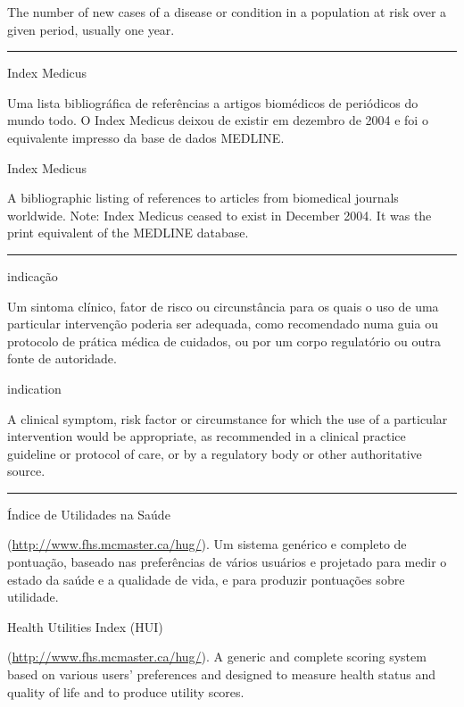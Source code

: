 \documentclass[
]{book}
\begin{document}
The number of new cases of a disease or condition in a population at risk over a given period, usually one year.

\begin{center}\rule{0.5\linewidth}{0.5pt}\end{center}

Index Medicus

Uma lista bibliográfica de referências a artigos biomédicos de periódicos do mundo todo. O Index Medicus deixou de existir em dezembro de 2004 e foi o equivalente impresso da base de dados MEDLINE.

Index Medicus

A bibliographic listing of references to articles from biomedical journals worldwide. Note: Index Medicus ceased to exist in December 2004. It was the print equivalent of the MEDLINE database.

\begin{center}\rule{0.5\linewidth}{0.5pt}\end{center}

indicação

Um sintoma clínico, fator de risco ou circunstância para os quais o uso de uma particular intervenção poderia ser adequada, como recomendado numa guia ou protocolo de prática médica de cuidados, ou por um corpo regulatório ou outra fonte de autoridade.

indication

A clinical symptom, risk factor or circumstance for which the use of a particular intervention would be appropriate, as recommended in a clinical practice guideline or protocol of care, or by a regulatory body or other authoritative source.

\begin{center}\rule{0.5\linewidth}{0.5pt}\end{center}

Índice de Utilidades na Saúde

(\url{http://www.fhs.mcmaster.ca/hug/}). Um sistema genérico e completo de pontuação, baseado nas preferências de vários usuários e projetado para medir o estado da saúde e a qualidade de vida, e para produzir pontuações sobre utilidade.

Health Utilities Index (HUI)

(\url{http://www.fhs.mcmaster.ca/hug/}). A generic and complete scoring system based on various users' preferences and designed to measure health status and quality of life and to produce utility scores.
\end{document}
